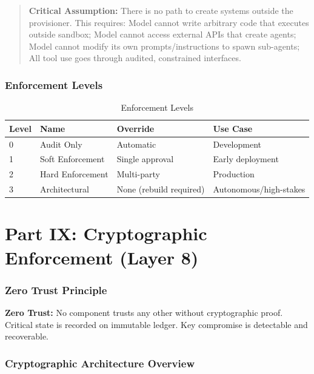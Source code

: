 \documentclass[11pt,letterpaper]{article}
\theoremstyle{definition}
\theoremstyle{remark}
\begin{document}
\begin{quote}
\textbf{Critical Assumption:} There is no path to create systems outside the provisioner. This requires: Model cannot write arbitrary code that executes outside sandbox; Model cannot access external APIs that create agents; Model cannot modify its own prompts/instructions to spawn sub-agents; All tool use goes through audited, constrained interfaces.
\end{quote}

\section{Enforcement Levels}

\begin{table}[h]
\centering
\begin{tabular}{@{}llll@{}}
\toprule
\textbf{Level} & \textbf{Name} & \textbf{Override} & \textbf{Use Case} \\
\midrule
0 & Audit Only & Automatic & Development \\
1 & Soft Enforcement & Single approval & Early deployment \\
2 & Hard Enforcement & Multi-party & Production \\
3 & Architectural & None (rebuild required) & Autonomous/high-stakes \\
\bottomrule
\end{tabular}
\caption{Enforcement Levels}
\end{table}



\part*{Part IX: Cryptographic Enforcement (Layer 8)}

\section{Zero Trust Principle}

\textbf{Zero Trust:} No component trusts any other without cryptographic proof. Critical state is recorded on immutable ledger. Key compromise is detectable and recoverable.

\section{Cryptographic Architecture Overview}
\end{document}
